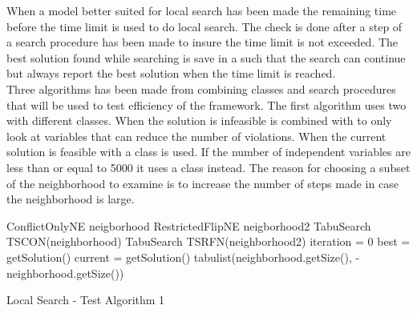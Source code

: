 When a model better suited for local search has been made the remaining time before the time limit is used to do local 
search. The check is done after a step of a search procedure has been made to insure the time limit is not exceeded. 
The best solution found while searching is save in a  such that the search can continue but always report 
the best solution when the time limit is reached. \\ 
Three algorithms has been made from combining  classes and search procedures that will be used to 
test efficiency of the framework. The first algorithm uses two  with different 
 classes. When the solution is infeasible  is combined with  
to only look at variables that can reduce the number of violations. When the current solution is feasible 
 with a  class is used. If the number of independent variables are less than 
or equal to 5000 it uses a  class instead. The reason for choosing a subset of the neighborhood 
to examine is to increase the number of steps made in case the neighborhood is large. \\
\IncMargin{1em}
\begin{algorithm}[H]

  \algdata
ConflictOnlyNE neigborhood \;
RestrictedFlipNE neigborhood2 \;
TabuSearch TSCON(neighborhood) \;
TabuSearch TSRFN(neighborhood2) \;
\int iteration = 0 \;
\int[] best = getSolution() \;
\int[] current = getSolution() \;
\int[] tabulist(neighborhood.getSize(), -neighborhood.getSize()) \;
\caption{Local Search - Test Algorithm 1} \label{algo_LS1} 
\end{algorithm} \noindent
\DecMargin{1em} \\
